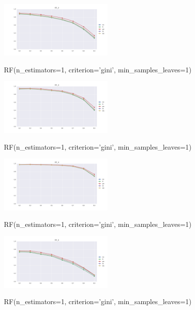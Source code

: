 \documentclass{sig-alternate-05-2015}
\begin{document}
\begin{figure}[]
  \centering
  \caption{RF(n\_estimators=1, criterion='gini', min\_samples\_leaves=1)}
  \includegraphics[width=0.5\textwidth]{../plots/RF_2}
  \label{fig:anomalySetup}
\end{figure}

\begin{figure}[]
  \centering
  \caption{RF(n\_estimators=1, criterion='gini', min\_samples\_leaves=1)}
  \includegraphics[width=0.5\textwidth]{../plots/RF_3}
  \label{fig:anomalySetup}
\end{figure}

\begin{figure}[]
  \centering
  \caption{RF(n\_estimators=1, criterion='gini', min\_samples\_leaves=1)}
  \includegraphics[width=0.5\textwidth]{../plots/RF_4}
  \label{fig:anomalySetup}
\end{figure}

\begin{figure}[]
  \centering
  \caption{RF(n\_estimators=1, criterion='gini', min\_samples\_leaves=1)}
  \includegraphics[width=0.5\textwidth]{../plots/RF_5}
  \label{fig:anomalySetup}
\end{figure}
\end{document}
